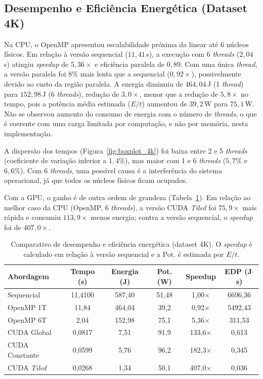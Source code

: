 \documentclass[12pt]{article}
\begin{document}
\subsection{Desempenho e Eficiência Energética (Dataset 4K)}

Na CPU, o OpenMP apresentou escalabilidade próxima da linear até 6 núcleos físicos. Em relação à versão sequencial ($11{,}41$\,s), a execução com 6 \textit{threads} ($2{,}04$\,s) atingiu \textit{speedup} de $5{,}36\times$ e eficiência paralela de $0{,}89$. Com uma única \textit{thread}, a versão paralela foi $8\%$ mais lenta que a sequencial ($0{,}92\times$), possivelmente devido ao custo da região paralela. A energia diminuiu de $464{,}04$\,J (1 \textit{thread}) para $152{,}98$\,J (6 \textit{threads}), redução de $3{,}0\times$, menor que a redução de $5{,}8\times$ no tempo, pois a potência média estimada ($E/t$) aumentou de $39{,}2$\,W para $75{,}1$\,W. Não se observou aumento do consumo de energia com o número de \textit{threads}, o que é coerente com uma carga limitada por computação, e não por memória, nesta implementação.

A dispersão dos tempos (Figura~\ref{fig:boxplot_4k}) foi baixa entre 2 e 5 \textit{threads} (coeficiente de variação inferior a $1{,}4\%$), mas maior com 1 e 6 \textit{threads} ($5{,}7\%$ e $6{,}6\%$). Com 6 \textit{threads}, uma possível causa é a interferência do sistema operacional, já que todos os núcleos físicos ficam ocupados.

Com a GPU, o ganho é de outra ordem de grandeza (Tabela~\ref{tab:gpu_metrics}). Em relação ao melhor caso da CPU (OpenMP, 6 \textit{threads}), a versão CUDA \textit{Tiled} foi $75{,}9\times$ mais rápida e consumiu $113{,}9\times$ menos energia; contra a versão sequencial, o \textit{speedup} foi de $407{,}0\times$.


\begin{table}[htpb]
    \centering
    \caption{Comparativo de desempenho e eficiência energética (dataset 4K). O \textit{speedup} é calculado em relação à versão sequencial e a Pot. é estimada por $E/t$.}
    \label{tab:gpu_metrics}
    \small
    \setlength{\tabcolsep}{3pt}
    \begin{tabular}{lccccc}
        \hline
        \textbf{Abordagem} & \textbf{Tempo (s)} & \textbf{Energia (J)} & \textbf{Pot. (W)} & \textbf{Speedup} & \textbf{EDP (J$\cdot$s)} \\
        \hline
        Sequencial       & 11,4100  & 587,40 & 51,48 & 1,00$\times$   & 6696,36 \\
        OpenMP 1T        & 11,84  & 464,04 & 39,2 & 0,92$\times$  & 5492,43 \\
        OpenMP 6T        & 2,04   & 152,98 & 75,1 & 5,36$\times$  & 311,53  \\
        CUDA Global      & 0,0817 & 7,51   & 91,9 & 133,6$\times$ & 0,613   \\
        CUDA Constante   & 0,0599 & 5,76   & 96,2 & 182,3$\times$ & 0,345   \\
        CUDA \textit{Tiled} & 0,0268 & 1,34 & 50,1 & 407,0$\times$ & 0,036 \\
        \hline
    \end{tabular}
\end{table}
\end{document}
